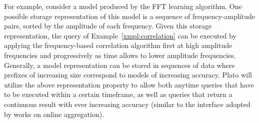 For example, consider a model produced by the FFT learning algorithm. One possible storage representation of this model is a sequence of frequency-amplitude pairs, sorted by the amplitude of each frequency. Given this storage representation, the query of Example~\ref{xmpl:correlation} can be executed by applying the frequency-based correlation algorithm first at high amplitude frequencies and progressively as time allows to lower amplitude frequencies. Generally, a model representation can be stored in sequences of data where prefixes of increasing size correspond to models of increasing accuracy. Plato will utilize the above representation property to allow both anytime queries that have to be executed within a certain timeframe, as well as queries that return a continuous result with ever increasing accuracy (similar to the interface adopted by works on online aggregation). 



